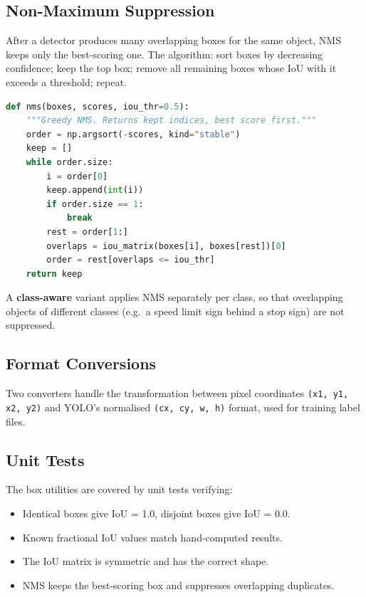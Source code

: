 \documentclass[12pt,a4paper]{article}
\begin{document}
\subsection{Non-Maximum Suppression}

After a detector produces many overlapping boxes for the same object, NMS keeps only the best-scoring one. The algorithm: sort boxes by decreasing confidence; keep the top box; remove all remaining boxes whose IoU with it exceeds a threshold; repeat.

\begin{lstlisting}[language=Python, caption={Greedy NMS implementation.}]
def nms(boxes, scores, iou_thr=0.5):
    """Greedy NMS. Returns kept indices, best score first."""
    order = np.argsort(-scores, kind="stable")
    keep = []
    while order.size:
        i = order[0]
        keep.append(int(i))
        if order.size == 1:
            break
        rest = order[1:]
        overlaps = iou_matrix(boxes[i], boxes[rest])[0]
        order = rest[overlaps <= iou_thr]
    return keep
\end{lstlisting}

A \textbf{class-aware} variant applies NMS separately per class, so that overlapping objects of different classes (e.g.\ a speed limit sign behind a stop sign) are not suppressed.

\subsection{Format Conversions}

Two converters handle the transformation between pixel coordinates \texttt{(x1, y1, x2, y2)} and YOLO's normalised \texttt{(cx, cy, w, h)} format, used for training label files.

\subsection{Unit Tests}

The box utilities are covered by unit tests verifying:
\begin{itemize}[leftmargin=2em, itemsep=2pt]
  \item Identical boxes give IoU = 1.0, disjoint boxes give IoU = 0.0.
  \item Known fractional IoU values match hand-computed results.
  \item The IoU matrix is symmetric and has the correct shape.
  \item NMS keeps the best-scoring box and suppresses overlapping duplicates.
\end{itemize}
\end{document}
